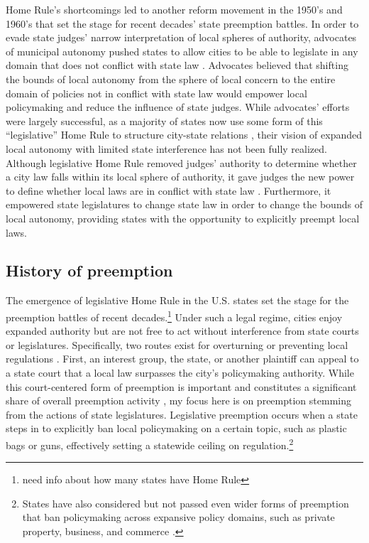 \documentclass[12pt]{article}
\begin{document}
Home Rule's shortcomings led to another reform movement in the 1950's and 1960's that set the stage for recent decades' state preemption battles. In order to evade state judges' narrow interpretation of local spheres of authority, advocates of municipal autonomy pushed states to allow cities to be able to legislate in any domain that does not conflict with state law \parencite{dillerIntrastatePreemption2007}. Advocates believed that shifting the bounds of local autonomy from the sphere of local concern to the entire domain of policies not in conflict with state law would empower local policymaking and reduce the influence of state judges. While advocates' efforts were largely successful, as a majority of states now use some form of this ``legislative'' Home Rule to structure city-state relations \parencite[p. 1126]{dillerIntrastatePreemption2007}, their vision of expanded local autonomy with limited state interference has not been fully realized. Although legislative Home Rule removed judges' authority to determine whether a city law falls within its local sphere of authority, it gave judges the new power to define whether local laws are in conflict with state law \parencite{dillerIntrastatePreemption2007}. Furthermore, it empowered state legislatures to change state law in order to change the bounds of local autonomy, providing states with the opportunity to explicitly preempt local laws. 

\subsection*{History of preemption}
The emergence of legislative Home Rule in the U.S. states set the stage for the preemption battles of recent decades.\footnote{need info about how many states have Home Rule} Under such a legal regime, cities enjoy expanded authority but are not free to act without interference from state courts or legislatures. Specifically, two routes exist for overturning or preventing local regulations \parencite{dillerIntrastatePreemption2007,goodmanStateLegislativeIdeology2019}. First, an interest group, the state, or another plaintiff can appeal to a state court that a local law surpasses the city's policymaking authority. While this court-centered form of preemption is important and constitutes a significant share of overall preemption activity \parencite{swansonStateGovernmentPreemption2018,dillerIntrastatePreemption2007}, my focus here is on preemption stemming from the actions of state legislatures. Legislative preemption occurs when a state steps in to explicitly ban local policymaking on a certain topic, such as plastic bags or guns, effectively setting a statewide ceiling on regulation.\footnote{States have also considered but not passed even wider forms of preemption that ban policymaking across expansive policy domains, such as private property, business, and commerce \parencite[p. 2007]{briffaultChallengeNewPreemption2018}.}
\end{document}

